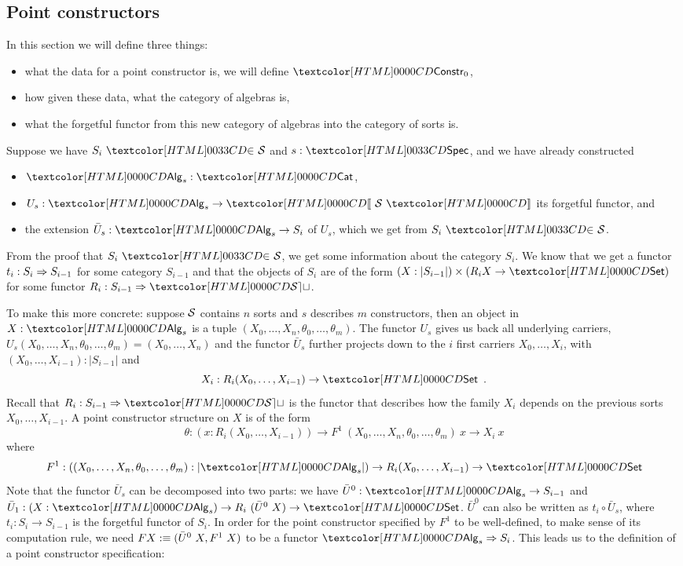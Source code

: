 \subsection{Point constructors}
\label{point-constructors}

In this section we will define three things:
%
\begin{itemize}
\item what the data for a point constructor is, \ie we will define $\Constr_0$,
\item how given these data, what the category of algebras is,
\item what the forgetful functor from this new category of algebras
  into the category of sorts is.
\end{itemize}
%
Suppose we have $\sortsin{S_i}{\Ss}$ and $s : \specty$, and we have
already constructed
%
\begin{itemize}
\item $\Alg_s : \Cat$,
\item $U_s : \Alg_s \to \SortCat{\Ss}$ its forgetful functor, and
\item the extension $\bar{U}_s : \Alg_s \to S_i$ of $U_s$, which we
  get from $\sortsin{S_i}{\Ss}$.
\end{itemize}
%
From the proof that $\sortsin{S_i}{\Ss}$, we get some information
about the category $S_i$. We know that we get a functor
$t_i : S_i \Rightarrow S_{i-1}$ for some category $S_{i-1}$ and that the
objects of $S_i$ are of the form
$(X : | S_{i-1} |) \times (R_i X \to \Set)$ for some functor
$R_i : \Func{S_{i-1}}{\SET}$.

To make this more concrete: suppose $\mathcal{S}$ contains $n$ sorts and $s$
describes $m$ constructors, then an object in $X : \Alg_s$ is a tuple
$(X_0, \hdots, X_n, \theta_0, \hdots, \theta_m)$. The functor $U_s$
gives us back all underlying carriers, \ie
$U_s(X_0, \hdots, X_n, \theta_0, \hdots, \theta_m) = (X_0, \hdots,
X_n)$
and the functor $\bar{U}_s$ further projects down to the $i$ first
carriers $X_0, \hdots, X_i$, with
$(X_0, \hdots, X_{i-1}) : | S_{i-1} |$ and
\[
X_i : R_i (X_0, \hdots, X_{i-1}) \to \Set \enspace .
\]
Recall that $R_i : \Func{S_{i-1}}{\SET}$ is the functor that describes how
the family $X_i$ depends on the previous sorts $X_0, \hdots,
X_{i-1}$. A point constructor structure on $X$ is of the form
$$
\theta : (x : R_i (X_0, \hdots, X_{i-1})) \to F^1\ (X_0, \hdots, X_n, \theta_0, \hdots, \theta_m)\ x \to X_i\ x
$$
where
$$
F^1 : ((X_0,\hdots,X_n,\theta_0,\hdots,\theta_m) : | \Alg_s |) \to R_i (X_0, \hdots, X_{i-1}) \to \Set
$$
Note that the functor $\bar{U}_s$ can be decomposed into two parts: we
have $\bar{U}^0 : \Alg_s \to S_{i-1}$ and
$\bar{U}_1 : (X : \Alg_s) \to R_i\ (\bar{U}^0\ X) \to \Set$.
$\bar{U}^0$ can also be written as $t_i \circ \bar{U}_s$, where
$t_i : S_i \to S_{i-1}$ is the forgetful functor of $S_i$. In order
for the point constructor specified by $F^1$ to be well-defined, \ie
to make sense of its computation rule, we need
$F X :\equiv (\bar{U}^0\ X, F^1\ X)$ to be a functor
$\Func{\Alg_s}{S_i}$.  This leads us to the definition of a point
constructor specification:

